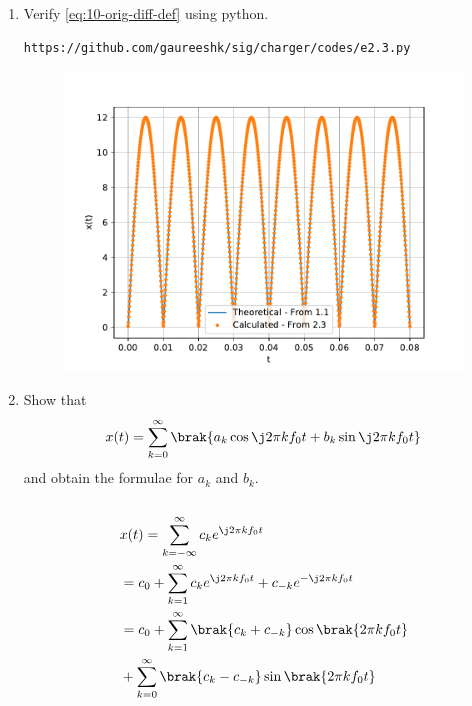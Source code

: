 \documentclass[journal,12pt,twocolumn]{IEEEtran}
\renewcommand\thesection{\arabic{section}}
\begin{document}
\begin{enumerate}[label=\thesection.\arabic*,ref=\thesection.\theenumi]
\item Verify 
	\eqref{eq:10-orig-diff-def}
	using python.
\begin{lstlisting}
https://github.com/gaureeshk/sig/charger/codes/e2.3.py
\end{lstlisting}
\begin{figure}[!ht]
	\begin{center}
		\includegraphics[width=\columnwidth]{./figs/e2.3.pdf}
	\end{center}
	\label{fig:}	
\end{figure}	

\item Show that 
\begin{align}
	x(t) = \sum_{k = 0}^{\infty}\brak{a_k\cos{\j2\pi kf_0 t}+b_k\sin{\j2\pi kf_0 t}}
\label{eq:one-Z-real}
\end{align}
and obtain the formulae for $a_k$ and $b_k$.\\
\solution\\
\begin{align}
	&x(t) = \sum_{k = -\infty}^{\infty}c_ke^{\j2\pi kf_0 t} \\
	&= c_0 + \sum_{k = 1}^{\infty}c_ke^{\j2\pi kf_0t} + c_{-k}e^{-\j2\pi kf_0t} \\
	&= c_0 + \sum_{k = 1}^{\infty}\brak{c_k + c_{-k}}\cos\brak{2\pi kf_0t}  \nonumber \\
	&+ \sum_{k = 0}^{\infty}\brak{c_k - c_{-k}}\sin\brak{2\pi kf_0t}
\end{align}


\end{enumerate}
\end{document}
